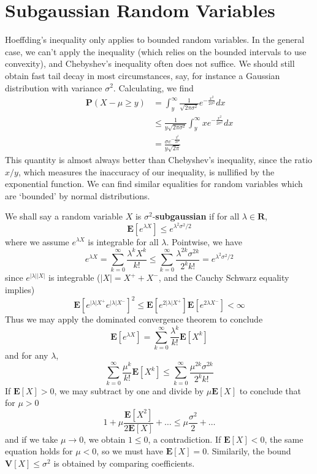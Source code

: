 \section{Subgaussian Random Variables}

Hoeffding's inequality only applies to bounded random variables. In the general case, we can't apply the inequality (which relies on the bounded intervals to use convexity), and Chebyshev's inequality often does not suffice. We should still obtain fast tail decay in most circumstances, say, for instance a Gaussian distribution with variance $\sigma^2$. Calculating, we find
%
\begin{align*}
    \mathbf{P}(X - \mu \geq y) &= \int_{y}^\infty \frac{1}{\sqrt{2 \pi \sigma^2}} e^{-\frac{x^2}{2 \sigma^2}} dx\\
    &\leq \frac{1}{y \sqrt{2 \pi \sigma^2}} \int_{y}^\infty x e^{- \frac{x^2}{2\sigma^2}} dx\\
    &= \frac{\sigma e^{- \frac{y^2}{2 \sigma^2}}}{y \sqrt{2 \pi}}
\end{align*}
%
This quantity is almost always better than Chebyshev's inequality, since the ratio $x/y$, which measures the inaccuracy of our inequality, is nullified by the exponential function. We can find similar equalities for random variables which are `bounded' by normal distributions.

We shall say a random variable $X$ is $\sigma^2$-{\bf subgaussian} if for all $\lambda \in \mathbf{R}$,
%
\[ \mathbf{E}[e^{\lambda X}] \leq e^{\lambda^2 \sigma^2/2} \]
%
where we assume $e^{\lambda X}$ is integrable for all $\lambda$. Pointwise, we have
%
\[ e^{\lambda X} = \sum_{k = 0}^\infty \frac{\lambda^k X^k}{k!} \leq \sum_{k = 0}^\infty \frac{\lambda^{2k} \sigma^{2k}}{2^k k!} = e^{\lambda^2 \sigma^2/2} \]
%
since $e^{|\lambda| |X|}$ is integrable ($|X| = X^+ + X^-$, and the Cauchy Schwarz equality implies)
%
\[ \mathbf{E}[e^{|\lambda| X^+} e^{|\lambda| X^-}]^2 \leq \mathbf{E}[e^{2 |\lambda| X^+}] \mathbf{E}[e^{2 \lambda X^-}] < \infty \]
%
Thus we may apply the dominated convergence theorem to conclude
%
\[ \mathbf{E}[e^{\lambda X}] = \sum_{k = 0}^\infty \frac{\lambda^k}{k!} \mathbf{E}[X^k] \]
%
and for any $\lambda$,
%
\[ \sum_{k = 0}^\infty \frac{\mu^k}{k!} \mathbf{E}[X^k] \leq \sum_{k = 0}^\infty \frac{\mu^{2k} \sigma^{2k}}{2^k k!} \]
%
If $\mathbf{E}[X] > 0$, we may subtract by one and divide by $\mu \mathbf{E}[X]$ to conclude that for $\mu > 0$
%
\[ 1 + \mu \frac{\mathbf{E}[X^2]}{2 \mathbf{E}[X]} + \dots \leq \mu \frac{\sigma^2}{2} + \dots \]
%
and if we take $\mu \to 0$, we obtain $1 \leq 0$, a contradiction. If $\mathbf{E}[X] < 0$, the same equation holds for $\mu < 0$, so we must have $\mathbf{E}[X] = 0$. Similarily, the bound $\mathbf{V}[X] \leq \sigma^2$ is obtained by comparing coefficients.

